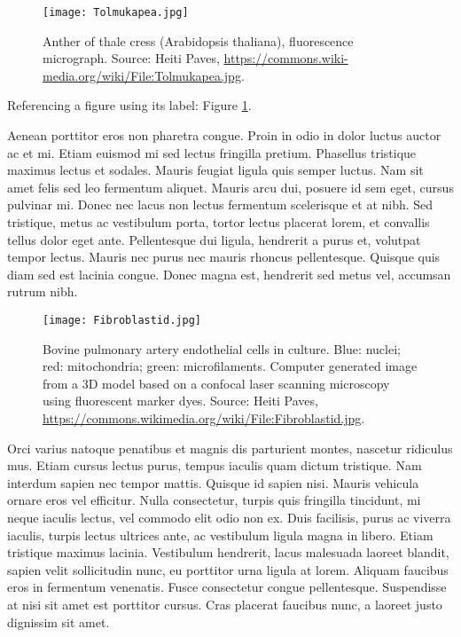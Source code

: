 \documentclass[a4paper]{LTJournalArticle}
\begin{document}
	\begin{figure} %
		\texttt{[image: Tolmukapea.jpg]}
		\caption{Anther of thale cress (Arabidopsis thaliana), fluorescence micrograph. Source: Heiti Paves, \href{https://commons.wikimedia.org/wiki/File:Tolmukapea.jpg}{https://commons.wiki-\\media.org/wiki/File:Tolmukapea.jpg}.}
		\label{fig:tcanther}
	\end{figure}
	
	Referencing a figure using its label: Figure \ref{fig:tcanther}.
	
	Aenean porttitor eros non pharetra congue. Proin in odio in dolor luctus auctor ac et mi. Etiam euismod mi sed lectus fringilla pretium. Phasellus tristique maximus lectus et sodales. Mauris feugiat ligula quis semper luctus. Nam sit amet felis sed leo fermentum aliquet. Mauris arcu dui, posuere id sem eget, cursus pulvinar mi. Donec nec lacus non lectus fermentum scelerisque et at nibh. Sed tristique, metus ac vestibulum porta, tortor lectus placerat lorem, et convallis tellus dolor eget ante. Pellentesque dui ligula, hendrerit a purus et, volutpat tempor lectus. Mauris nec purus nec mauris rhoncus pellentesque. Quisque quis diam sed est lacinia congue. Donec magna est, hendrerit sed metus vel, accumsan rutrum nibh.
	
	\begin{figure*} %
		\texttt{[image: Fibroblastid.jpg]}
		\caption{Bovine pulmonary artery endothelial cells in culture. Blue: nuclei; red: mitochondria; green: microfilaments. Computer generated image from a 3D model based on a confocal laser scanning microscopy using fluorescent marker dyes. Source: Heiti Paves, \href{https://commons.wikimedia.org/wiki/File:Fibroblastid.jpg}{https://commons.wikimedia.org/wiki/File:Fibroblastid.jpg}.}
		\label{fig:bpartery}
	\end{figure*}
	
	Orci varius natoque penatibus et magnis dis parturient montes, nascetur ridiculus mus. Etiam cursus lectus purus, tempus iaculis quam dictum tristique. Nam interdum sapien nec tempor mattis. Quisque id sapien nisi. Mauris vehicula ornare eros vel efficitur. Nulla consectetur, turpis quis fringilla tincidunt, mi neque iaculis lectus, vel commodo elit odio non ex. Duis facilisis, purus ac viverra iaculis, turpis lectus ultrices ante, ac vestibulum ligula magna in libero. Etiam tristique maximus lacinia. Vestibulum hendrerit, lacus malesuada laoreet blandit, sapien velit sollicitudin nunc, eu porttitor urna ligula at lorem. Aliquam faucibus eros in fermentum venenatis. Fusce consectetur congue pellentesque. Suspendisse at nisi sit amet est porttitor cursus. Cras placerat faucibus nunc, a laoreet justo dignissim sit amet.
	
\end{document}
